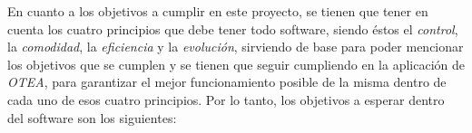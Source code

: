 

En cuanto a los objetivos a cumplir en este proyecto, se tienen que tener en
cuenta los cuatro principios que debe tener todo software, siendo éstos el
\textit{control}, la \textit{comodidad}, la \textit{eficiencia} y la
\textit{evolución}, sirviendo de base para poder mencionar los objetivos que se
cumplen y se tienen que seguir cumpliendo en la aplicación de \textit{OTEA},
para garantizar el mejor funcionamiento posible de la misma dentro de cada uno
de esos cuatro principios. Por lo tanto, los objetivos a esperar dentro del
software son los siguientes:
